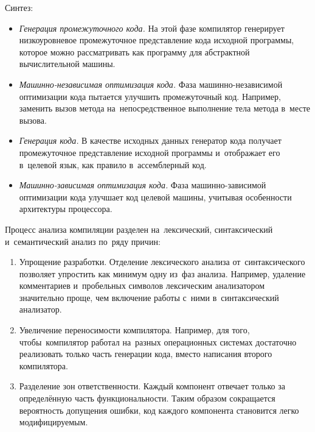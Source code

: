 Синтез:
\begin{itemize}	
\item{\textit{Генерация промежуточного кода.} На этой фазе компилятор генерирует низкоуровневое промежуточное представление кода исходной программы, которое можно рассматривать как программу для абстрактной вычислительной машины.}	
\item{\textit{Машинно-независимая оптимизация кода.} Фаза машинно-независимой оптимизации кода пытается улучшить промежуточный код. Например, заменить вызов метода на~непосредственное выполнение тела метода в~месте вызова.}	
\item{\textit{Генерация кода.} В качестве исходных данных генератор кода получает промежуточное представление исходной программы и~отображает его в~целевой язык, как правило в~ассемблерный код.}
\item{\textit{Машинно-зависимая оптимизация кода.} Фаза машинно-зависимой оптимизации кода улучшает код целевой машины, учитывая особенности архитектуры процессора.}		
\end{itemize}


Процесс анализа компиляции разделен на~лексический, синтаксический и~семантический анализ по~ряду причин: 

\begin{enumerate} 
	\item{Упрощение разработки. Отделение лексического анализа от~синтаксического позволяет упростить как минимум одну из~фаз анализа. Например, удаление комментариев и~пробельных символов лексическим анализатором значительно проще, чем включение работы с~ними в~синтаксический анализатор.}
	\item{Увеличение переносимости компилятора. Например, для того, чтобы~компилятор работал на~разных операционных системах достаточно реализовать только часть генерации кода, вместо написания второго компилятора.}
	\item{Разделение зон ответственности. Каждый компонент отвечает только за определённую часть функциональности. Таким образом сокращается вероятность допущения ошибки, код каждого компонента становится легко модифицируемым. }
\end{enumerate}
